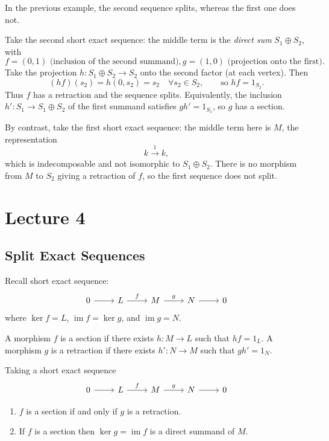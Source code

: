 \documentclass[11pt, a4paper]{report}
\begin{document}
\begin{example}
    In the previous example, the second sequence splits, whereas the first one does not.

    Take the second short exact sequence: the middle term is the \emph{direct sum} $S_1 \oplus S_2$, with
    \[
        f = (0,1) \text{ (inclusion of the second summand)},
        g = (1,0) \text{ (projection onto the first)}.
    \]
    Take the projection $h \colon S_1 \oplus S_2 \to S_2$ onto the second factor (at each vertex). Then
    \[
        (hf)(s_2) = h(0,s_2) = s_2 \quad \forall s_2 \in S_2,
        \qquad \text{so } hf = 1_{S_2}.
    \]
    Thus $f$ has a retraction and the sequence splits. Equivalently, the inclusion $h' \colon S_1 \to S_1 \oplus S_2$ of the first summand satisfies $gh' = 1_{S_1}$, so $g$ has a section.

    By contrast, take the first short exact sequence: the middle term here is $M$, the representation
    \[
        k \xrightarrow{1} k,
    \]
    which is indecomposable and not isomorphic to $S_1 \oplus S_2$. There is no morphism from $M$ to $S_2$ giving a retraction of $f$, so the first sequence does not split.
\end{example}

\chapter{Lecture 4}

\section{Split Exact Sequences}

Recall short exact sequence:
\[
    \begin{tikzcd}
        0 \arrow[r] & L \arrow[r, "f"] & M \arrow[r, "g"] & N \arrow[r] & 0
    \end{tikzcd}
\]
where $\operatorname{ker}f = L$, $\operatorname{im}f = \operatorname{ker}g$, and $\operatorname{im}g = N$.

A morphism $f$ is a section if there exists $h: M\to L$ such that $hf=1_L$. A morphism $g$ is a retraction if there exists $h': N\to M$ such that $gh'=1_N$.

\begin{theorem}
    Taking a short exact sequence
    \[
        \begin{tikzcd}
            0 \arrow[r] & L \arrow[r, "f"] & M \arrow[r, "g"] & N \arrow[r] & 0
        \end{tikzcd}
    \]
    \begin{enumerate}
        \item $f$ is a section if and only if $g$ is a retraction.
        \item If $f$ is a section then $\operatorname{ker}g = \operatorname{im}f$ is a direct summand of $M$.
    \end{enumerate}
\end{theorem}
\end{document}
